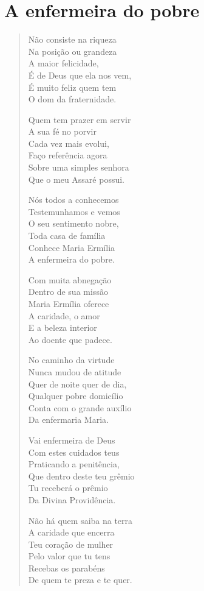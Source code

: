 \chapter{A enfermeira do pobre}

\begin{verse}
Não consiste na riqueza\\
Na posição ou grandeza\\
A maior felicidade,\\
É de Deus que ela nos vem,\\
É muito feliz quem tem\\
O dom da fraternidade.

Quem tem prazer em servir\\
A sua fé no porvir\\
Cada vez mais evolui,\\
Faço referência agora\\
Sobre uma simples senhora\\
Que o meu Assaré possui.

Nós todos a conhecemos\\
Testemunhamos e vemos\\
O seu sentimento nobre,\\
Toda casa de família\\
Conhece Maria Ermília\\
A enfermeira do pobre.

Com muita abnegação\\
Dentro de sua missão\\
Maria Ermília oferece\\
A caridade, o amor\\
E a beleza interior\\
Ao doente que padece.

No caminho da virtude\\
Nunca mudou de atitude\\
Quer de noite quer de dia,\\
Qualquer pobre domicílio\\
Conta com o grande auxílio\\
Da enfermaria Maria.

Vai enfermeira de Deus\\
Com estes cuidados teus\\
Praticando a penitência,\\
Que dentro deste teu grêmio\\
Tu receberá o prêmio\\
Da Divina Providência.

Não há quem saiba na terra\\
A caridade que encerra\\
Teu coração de mulher\\
Pelo valor que tu tens\\
Recebas os parabéns\\
De quem te preza e te quer.
\end{verse}

